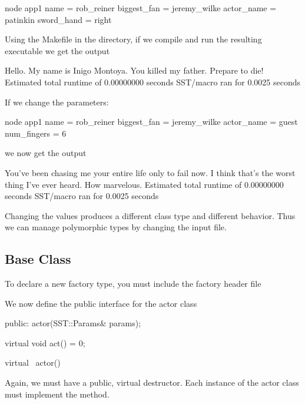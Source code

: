 \begin{ViFile}
node {
 app1 {
  name = rob_reiner
  biggest_fan = jeremy_wilke
  actor_name = patinkin
  sword_hand = right
 }
}
\end{ViFile}

Using the Makefile in the directory, if we compile and run the resulting executable we get the output

\begin{ViFile}
Hello. My name is Inigo Montoya. You killed my father. Prepare to die!
Estimated total runtime of           0.00000000 seconds
SST/macro ran for       0.0025 seconds
\end{ViFile}

If we change the parameters:

\begin{ViFile}
node {
 app1 {
  name = rob_reiner
  biggest_fan = jeremy_wilke
  actor_name = guest
  num_fingers = 6
 }
}
\end{ViFile}

we now get the output

\begin{ViFile}
You've been chasing me your entire life only to fail now.
I think that's the worst thing I've ever heard. How marvelous.
Estimated total runtime of           0.00000000 seconds
SST/macro ran for       0.0025 seconds
\end{ViFile}

Changing the values produces a different class type and different behavior.
Thus we can manage polymorphic types by changing the input file.

\subsection{Base Class}\label{subsec:baseClass}
To declare a new factory type, you must include the factory header file

\begin{CppCode}
#include <sprockit/factories/factory.h>

namespace sstmac {
    namespace tutorial {

class actor {
\end{CppCode}


We now define the public interface for the actor class

\begin{CppCode}
 public:
  actor(SST::Params& params);
  
  virtual void act() = 0;

  virtual ~actor(){}
\end{CppCode}
Again, we must have a public, virtual destructor.
Each instance of the actor class must implement the  method.

